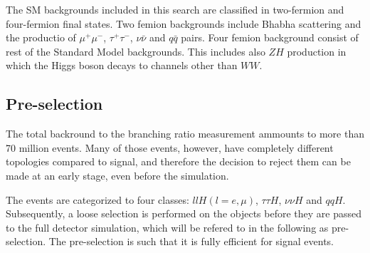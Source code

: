 \documentclass[11pt,a4paper]{cepcnote}
\begin{document}
The SM backgrounds included in this search are classified in two-fermion and four-fermion final states.
Two femion backgrounds include  Bhabha scattering and the productio of $\mu^+\mu^-$, $\tau^+\tau^-$, $\nu\bar{\nu}$ and $q\bar{q}$ pairs.
Four femion background consist of rest of the Standard Model backgrounds.
This includes also $ZH$ production in which the Higgs boson decays to channels other than $WW$.

\subsection{Pre-selection}
The total backround to the branching ratio measurement ammounts to more than 70 million events.
Many of those events, however, have completely different topologies compared to signal, and therefore
the decision to reject them can be made at an early stage, even before the simulation.

The events are categorized to four classes: $llH(l=e,\mu)$, $\tau\tau H$, 
$\nu\nu H$ and $qqH$. Subsequently,  a loose selection is performed on the objects
before they are passed to the full detector simulation, which will be refered to in the
following as pre-selection. The pre-selection is such that it is fully efficient for
signal events.
\end{document}
